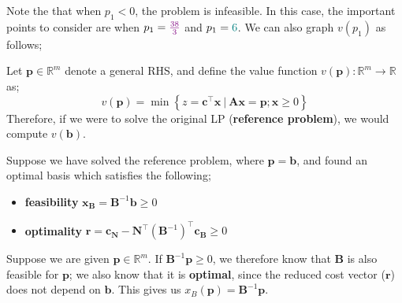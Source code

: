 \documentclass[a4paper, 12pt]{article}
\newcommand{\mat}[1]{\boldsymbol{#1}}
\renewcommand{\vec}[1]{\boldsymbol{#1}}
\newcommand{\violet}[1]{\textcolor{violet}{#1}}
\newcommand{\teal}[1]{\textcolor{teal}{#1}}
\begin{document}
                Note the that when $p_1 < 0$, the problem is infeasible.
                In this case, the important points to consider are when $p_1 = \violet{\frac{38}{3}}$ and $p_1 = \teal{6}$.
                We can also graph $v(p_1)$ as follows;
                \begin{center}
                \end{center}
                Let $\vec{p} \in \mathbb{R}^m$ denote a general RHS, and define the value function $v(\vec{p}) : \mathbb{R}^m \to \mathbb{R}$ as;
                $$v(\vec{p}) = \min \left\{z = \vec{c}^\top\vec{x}\ |\ \mat{A}\vec{x} = \vec{p}; \vec{x} \geq 0\right\}$$
                Therefore, if we were to solve the original LP (\textbf{reference problem}), we would compute $v(\vec{b})$.
                \medskip

                Suppose we have solved the reference problem, where $\vec{p} = \vec{b}$, and found an optimal basis which satisfies the following;
                \begin{itemize}
                    \itemsep0em
                    \item \textbf{feasibility} \hfill $\vec{x_B} = \mat{B}^{-1}\vec{b} \geq 0$
                    \item \textbf{optimality} \hfill $\vec{r} = \vec{c_N} - \mat{N}^\top\left(\mat{B}^{-1}\right)^\top\vec{c_B} \geq 0$
                \end{itemize}
                Suppose we are given $\vec{p} \in \mathbb{R}^m$.
                If $\mat{B}^{-1}\vec{p} \geq 0$, we therefore know that $\mat{B}$ is also feasible for $\vec{p}$; we also know that it is \textbf{optimal}, since the reduced cost vector ($\vec{r}$) does not depend on $\vec{b}$.
                This gives us $x_B(\vec{p}) = \mat{B}^{-1}\vec{p}$.
                \medskip
\end{document}
